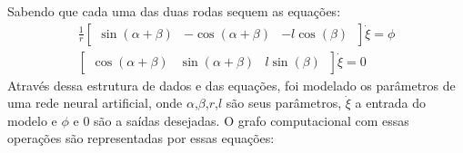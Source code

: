 Sabendo que cada uma das duas rodas sequem as equações:
\begin{align}
    \frac{1}{r}
    \begin{bmatrix}
        \sin(\alpha + \beta) &  -\cos(\alpha + \beta) & -l\cos(\beta) \
    \end{bmatrix}
    \dot{\xi}
    = \phi \\
    \begin{bmatrix}
        \cos(\alpha + \beta) &  \sin(\alpha + \beta) & l\sin(\beta) \
    \end{bmatrix}
    \dot{\xi}
    = 0 
\end{align}
Através dessa estrutura de dados e das equações, foi
modelado os parâmetros de uma rede neural artificial,
onde $\alpha$,$\beta$,$r$,$l$ são seus parâmetros,
$\dot{\xi}$ a entrada do modelo e $\phi$ e $0$  são a saídas desejadas.
O grafo computacional com essas operações são representadas por essas equações:

